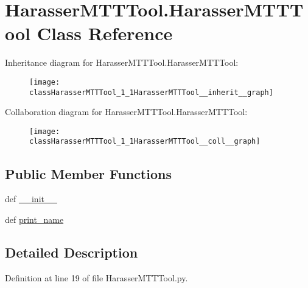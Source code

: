 \hypertarget{classHarasserMTTTool_1_1HarasserMTTTool}{\section{Harasser\-M\-T\-T\-Tool.\-Harasser\-M\-T\-T\-Tool Class Reference}
\label{classHarasserMTTTool_1_1HarasserMTTTool}
}


Inheritance diagram for Harasser\-M\-T\-T\-Tool.\-Harasser\-M\-T\-T\-Tool\-:\nopagebreak
\begin{figure}[H]
\begin{center}
\leavevmode
\texttt{[image: classHarasserMTTTool\_1\_1HarasserMTTTool\_\_inherit\_\_graph]}
\end{center}
\end{figure}


Collaboration diagram for Harasser\-M\-T\-T\-Tool.\-Harasser\-M\-T\-T\-Tool\-:\nopagebreak
\begin{figure}[H]
\begin{center}
\leavevmode
\texttt{[image: classHarasserMTTTool\_1\_1HarasserMTTTool\_\_coll\_\_graph]}
\end{center}
\end{figure}
\subsection*{Public Member Functions}
\begin{DoxyCompactItemize}
\item 
def \hyperlink{classHarasserMTTTool_1_1HarasserMTTTool_a32ad82e3e366cea8260fd2e97549a9df}{\-\_\-\-\_\-init\-\_\-\-\_\-}
\item 
def \hyperlink{classHarasserMTTTool_1_1HarasserMTTTool_ae13957995dad16310ade5c58f0f7fe27}{print\-\_\-name}
\end{DoxyCompactItemize}


\subsection{Detailed Description}


Definition at line 19 of file Harasser\-M\-T\-T\-Tool.\-py.



